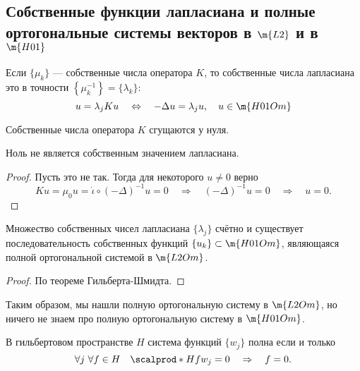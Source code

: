 \subsection{Собственные функции лапласиана и полные ортогональные системы векторов в $\m{L2}$ и в $\m{H01}$}
\begin{note}
Если $\{ \mu_k \}$ --- собственные числа оператора $K$, то собственные числа лапласиана это в точности $\left\{ \mu_k^{-1} \right\} = \{ \lambda_k \}$:
$$ u = \lambda_j K u \quad \Leftrightarrow \quad - \Delta u = \lambda_j u, \quad u \in \m{H01Om}$$
\end{note}
\begin{note}
Собственные числа оператора $K$ сгущаются у нуля.
\end{note}
\begin{note}
Ноль не является собственным значением лапласиана.
\end{note}
\begin{proof}
Пусть это не так. Тогда для некоторого $u \neq 0$ верно
$$ K u = \mu_0 u = \dot\iota \circ ( - \Delta)^{-1} u = 0 \quad \Rightarrow \quad (-\Delta)^{-1} u = 0 \quad \Rightarrow \quad u = 0.$$

\end{proof}

\begin{theorem}
Множество собственных чисел лапласиана $\{\lambda_j\}$ счётно и существует последовательность собственных функций $\{ u_k \} \subset \m{H01Om}$, являющаяся полной ортогональной системой в $\m{L2Om}$.
\end{theorem}
\begin{proof}
По теореме Гильберта-Шмидта.

\end{proof}

Таким образом, мы нашли полную ортогональную систему в $\m{L2Om}$, но ничего не знаем про полную ортогональную систему в $\m{H01Om}$.

\begin{reminder}В гильбертовом пространстве $H$ система функций $\{ w_j \}$ полна если и только
$$ \forall j \, \, \forall f \in H \quad \scalprod*{H}{f}{w_j} = 0 \quad \Rightarrow \quad f = 0.$$
\end{reminder}

